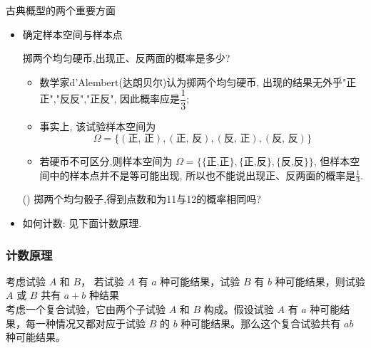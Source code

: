 \begin{frame}{古典概型的两个重要方面}
	\begin{itemize}[<+-|alert@+>]
		\item 确定样本空间与样本点\pause
		\begin{exam} 掷两个均匀硬币,出现正、反两面的概率是多少?
		\end{exam}
		\pause
		\begin{itemize}[<+-|alert@+>]
			\item 数学家d'Alembert(达朗贝尔)认为掷两个均匀硬币, 出现的结果无外乎"正正","反反","正反", %
			因此概率应是$\dfrac{1}{3}$;
			\item 事实上, 该试验样本空间为 $$\Omega=\{(\text{正, 正}),(\text{正, 反}), (\text{反, 正}), (\text{反, 反})\}$$
			\item 若硬币不可区分,则样本空间为 $\Omega=\{\{\text{正,正}\},\{\text{正,反}\}, \{\text{反,反}\}\}$, 但样本空间中的样本点并不是等可能出现, 所以也不能说出现正、反两面的概率是$\frac{1}{3}$.
		\end{itemize}
        \begin{exam}() 掷两个均匀骰子,得到点数和为11与12的概率相同吗?
		\end{exam}

		\item 如何计数: 见下面计数原理.
	\end{itemize}


\end{frame}






	\begin{frame}
		\frametitle{计数原理}
			 考虑试验 $A$ 和 $B$， 若试验 $A$ 有 $a$ 种可能结果，试验 $B$ 有 $b$ 种可能结果，则试验 $A$ 或 $B$ 共有 $a+b$ 种结果 %
				\\
			\vspace{0.5cm}
			\pause
		   考虑一个复合试验，它由两个子试验 $A$ 和 $B$ 构成。假设试验 $A$ 有 $a$  种可能结
		果，每一种情况又都对应于试验 $B$ 的 $b$ 种可能结果。那么这个复合试验共有 $ab$ 种可能结果。%

	\end{frame}

